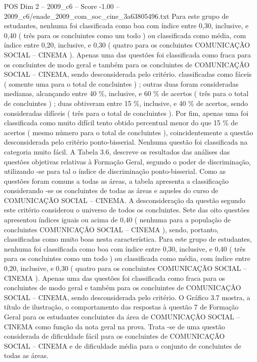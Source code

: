 \begin{textsample}{POS Dim 2 – 2009\_c6 – Score -1.00 – 2009\_c6/enade\_2009\_com\_soc\_cine\_3a63805496.txt}
Para este grupo de estudantes, nenhuma foi classificada como boa com índice entre 0,30, inclusive, e 0,40 ( três para os concluintes como um todo ) ou classificada como média, com índice entre 0,20, inclusive, e 0,30 ( quatro para os concluintes COMUNICAÇÃO SOCIAL – CINEMA ).
Apenas uma das questões foi classificada como fraca para os concluintes de modo geral e também para os concluintes de COMUNICAÇÃO SOCIAL – CINEMA, sendo desconsiderada pelo critério. classificadas como fáceis ( somente uma para o total de concluintes ) ; outras duas foram consideradas medianas, alcançando entre 40 \%, inclusive, e 60 \% de acertos ( três para o total de concluintes ) ; duas obtiveram entre 15 \%, inclusive, e 40 \% de acertos, sendo consideradas difíceis ( três para o total de concluintes ).
Por fim, apenas uma foi classificada como muito difícil tento obtido percentual menor do que 15 \% de acertos ( mesmo número para o total de concluintes ), coincidentemente a questão desconsiderada pelo critério ponto-bisserial.
Nenhuma questão foi classificada na categoria muito fácil.
A Tabela 3.6, descreve os resultados das análises das questões objetivas relativas à Formação Geral, segundo o poder de discriminação, utilizando -se para tal o índice de discriminação ponto-bisserial.
Como as questões foram comuns a todas as áreas, a tabela apresenta a classificação considerando -se os concluintes de todas as áreas e aqueles do curso de COMUNICAÇÃO SOCIAL – CINEMA.
A desconsideração da questão segundo este critério considerou o universo de todos os concluintes.
Sete das oito questões apresentou índices iguais ou acima de 0,40 ( nenhuma para a população de concluintes COMUNICAÇÃO SOCIAL – CINEMA ), sendo, portanto, classificadas como muito boas nesta característica.
Para este grupo de estudantes, nenhuma foi classificada como boa com índice entre 0,30, inclusive, e 0,40 ( três para os concluintes como um todo ) ou classificada como média, com índice entre 0,20, inclusive, e 0,30 ( quatro para os concluintes COMUNICAÇÃO SOCIAL – CINEMA ).
Apenas uma das questões foi classificada como fraca para os concluintes de modo geral e também para os concluintes de COMUNICAÇÃO SOCIAL – CINEMA, sendo desconsiderada pelo critério.
O Gráfico 3.7 mostra, a título de ilustração, o comportamento das respostas à questão 7 de Formação Geral para os estudantes concluintes da área de COMUNICAÇÃO SOCIAL – CINEMA como função da nota geral na prova.
Trata -se de uma questão considerada de dificuldade fácil para os concluintes de COMUNICAÇÃO SOCIAL – CINEMA e de dificuldade média para o conjunto de concluintes de todas as áreas.

\end{textsample}
